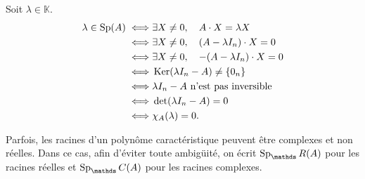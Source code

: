 \begin{prv}
	Soit $\lambda \in \mathds{K}$.
	\begin{align*}
		\lambda \in \operatorname{Sp}(A) \iff& \exists X \neq 0,\quad A\cdot X = \lambda X\\
		\iff& \exists X \neq 0,\quad (A-\lambda I_n) \cdot X = 0\\
		\iff& \exists X \neq 0,\quad -(A-\lambda I_n) \cdot X = 0\\
		\iff& \operatorname{Ker}(\lambda I_n - A) \neq \{0_n\}\\
		\iff& \lambda I_n - A \text{ n'est pas inversible}\\
		\iff& \operatorname{det}(\lambda I_n - A) = 0\\
		\iff& \chi_A(\lambda) = 0.
	\end{align*}
\end{prv}

\begin{rmkn}[Attention]
	Parfois, les racines d'un polynôme caractéristique peuvent être complexes et non réelles. Dans ce cas, afin d'éviter toute ambigüité, on écrit $\Sp_\R(A)$\/ pour les racines réelles et $\Sp_\C(A)$\/ pour les racines complexes.
\end{rmkn}

